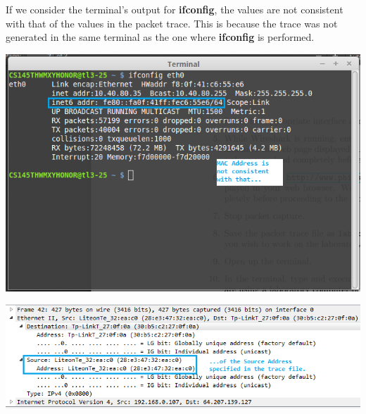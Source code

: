 \documentclass[11pt]{article}
\begin{document}
\begin{enumerate}
If we consider the terminal's output for \textbf{ifconfig}, the values are not consistent with that of the values in the packet trace. This is because the trace was not generated in the same terminal as the one where \textbf{ifconfig} is performed.

\begin{center}
\includegraphics[scale=0.5]{terminal2}
\end{center}

\begin{center}
\includegraphics[scale=0.75]{9}
\end{center}

\end{enumerate}
\end{document}
